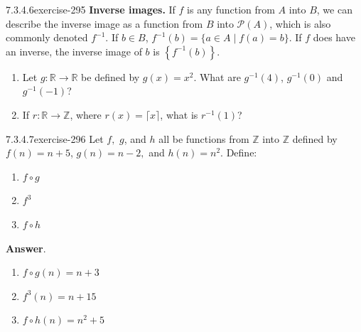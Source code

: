 \documentclass[twoside,10pt,]{book}
\newcommand{\terminology}[1]{\textbf{#1}}
\numberwithin{equation}{section}
\begin{document}
\begin{divisionsolution}{7.3.4.6}{}{exercise-295}%
\hypertarget{p-2483}{}%
\terminology{Inverse images.} If \(f\) is any function from \(A\) into \(B\), we can describe the inverse image as a function from \(B\) into \(\mathcal{P}(A)\), which is also commonly denoted \(f^{-1}\). If \(b \in  B\), \(f^{-1}(b) = \{a \in A\mid f(a) = b\}\). If \(f\) does have an inverse, the inverse image of \(b\) is \(\left\{f^{-1}(b)\right\}\).%
\par
\hypertarget{p-2484}{}%
\leavevmode%
\begin{enumerate}[label=(\alph*)]
\item\hypertarget{li-1262}{}\hypertarget{p-2485}{}%
Let \(g : \mathbb{R} \to  \mathbb{R}\) be defined by \(g(x) = x^2\). What are \(g^{-1}(4)\), \(g^{-1}(0)\) and \(g^{-1}(-1)\)?%
\item\hypertarget{li-1263}{}\hypertarget{p-2486}{}%
If \(r: \mathbb{R}\to \mathbb{Z}\), where \(r(x) = \lceil x\rceil\),  what is \(r^{-1}(1)\)?%
\end{enumerate}
%
\end{divisionsolution}%
\begin{divisionsolution}{7.3.4.7}{}{exercise-296}%
\hypertarget{p-2487}{}%
Let \(f,\)  \(g\), and \(h\) all be functions from \(\mathbb{Z}\) into \(\mathbb{Z}\) defined by \(f(n) = n + 5\), \(g(n) = n - 2,\) and \(h(n)=n^2\). Define:%
\par
\hypertarget{p-2488}{}%
\leavevmode%
\begin{enumerate}[label=(\alph*)]
\item\hypertarget{li-1264}{}\hypertarget{p-2489}{}%
\(f\circ g\)%
\item\hypertarget{li-1265}{}\hypertarget{p-2490}{}%
\(f^3\)%
\item\hypertarget{li-1266}{}\hypertarget{p-2491}{}%
\(f\circ h\)%
\end{enumerate}
%
\par\smallskip%
\noindent\textbf{Answer}.\quad%
\hypertarget{p-2492}{}%
\leavevmode%
\begin{enumerate}[label=(\alph*)]
\item\hypertarget{li-1267}{}\hypertarget{p-2493}{}%
\(f\circ g(n)=n+3\)%
\item\hypertarget{li-1268}{}\hypertarget{p-2494}{}%
\(f^3(n)=n+15\)%
\item\hypertarget{li-1269}{}\hypertarget{p-2495}{}%
\(f\circ h(n)=n^2+5\)%
\end{enumerate}
%
\end{divisionsolution}%
\end{document}
